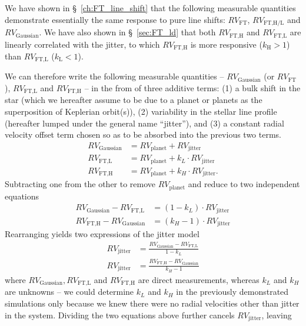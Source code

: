 We have shown in \S~\ref{ch:FT_line_shift} that the following measurable quantities demonstrate essentially the same response to pure line shifts: $RV_\text{FT}$, $RV_\text{FT,H/L}$ and $RV_\text{Gaussian}$. We have also shown in \S~\ref{sec:FT_ld} that both $RV_\text{FT,H}$ and $RV_\text{FT,L}$ are linearly correlated with the jitter, to which $RV_\text{FT,H}$ is more responsive ($k_\text{H}>1$) than $RV_\text{FT,L}$ ($k_\text{L}<1$). 

We can therefore write the following measurable quantities -- $RV_\text{Gaussian}$ (or $RV_\text{FT}$), $RV_\text{FT,L}$ and $RV_\text{FT,H}$ -- in the from of three additive terms: (1) a bulk shift in the star (which we hereafter assume to be due to a planet or planets as the superposition of Keplerian orbit(s)), (2) variability in the stellar line profile (hereafter lumped under the general name ``jitter''), and (3) a constant radial velocity offset term chosen so as to be absorbed into the previous two terms.
\begin{align}
	RV_\text{Gaussian} 	&= RV_\text{planet} + RV_\text{jitter}				 \label{eq:RV_Gau} \\
	RV_\text{FT,L} 		&= RV_\text{planet} + k_L \cdot RV_\text{jitter} 		 \label{eq:RV_FTL} \\
	RV_\text{FT,H} 		&= RV_\text{planet} + k_H \cdot RV_\text{jitter}.		 \label{eq:RV_FTH}
\end{align}
Subtracting one from the other to remove $RV_\text{planet}$ and reduce to two independent equations
\begin{align}
	RV_\text{Gaussian} - RV_\text{FT,L} 	&= (1-k_L) \cdot RV_\text{jitter}\\
	RV_\text{FT,H} - RV_\text{Gaussian}	&= (k_H-1) \cdot RV_\text{jitter}
\end{align}
Rearranging yields two expressions of the jitter model
\begin{align}
	RV_\text{jitter} &= \frac{RV_\text{Gaussian} - RV_\text{FT,L}}{1-k_L} 	\label{eq:jitter_model1} \\
	RV_\text{jitter} &= \frac{RV_\text{FT,H} - RV_\text{Gaussian}}{k_H-1}		\label{eq:jitter_model2} 
\end{align}
where $RV_\text{Gaussian}, RV_\text{FT,L}$ and $RV_\text{FT,H}$ are direct measurements, whereas $k_L$ and $k_H$ are unknowns -- we could determine $k_L$ and $k_H$ in the previously demonstrated simulations only because we knew there were no radial velocities other than jitter in the system. Dividing the two equations above further cancels $RV_\text{jitter}$, leaving 
